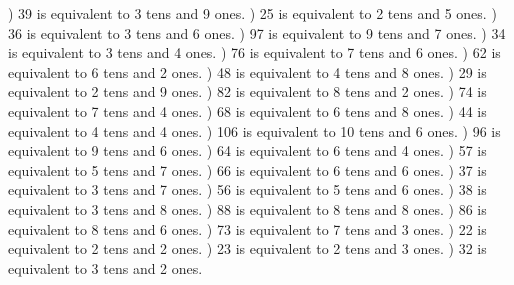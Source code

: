 \documentclass{article}%
\begin{document}
) 39 is equivalent to  3 tens and 9 ones.%
) 25 is equivalent to  2 tens and 5 ones.%
) 36 is equivalent to  3 tens and 6 ones.%
) 97 is equivalent to  9 tens and 7 ones.%
) 34 is equivalent to  3 tens and 4 ones.%
) 76 is equivalent to  7 tens and 6 ones.%
) 62 is equivalent to  6 tens and 2 ones.%
) 48 is equivalent to  4 tens and 8 ones.%
) 29 is equivalent to  2 tens and 9 ones.%
) 82 is equivalent to  8 tens and 2 ones.%
) 74 is equivalent to  7 tens and 4 ones.%
) 68 is equivalent to  6 tens and 8 ones.%
) 44 is equivalent to  4 tens and 4 ones.%
) 106 is equivalent to  10 tens and 6 ones.%
) 96 is equivalent to  9 tens and 6 ones.%
) 64 is equivalent to  6 tens and 4 ones.%
) 57 is equivalent to  5 tens and 7 ones.%
) 66 is equivalent to  6 tens and 6 ones.%
) 37 is equivalent to  3 tens and 7 ones.%
) 56 is equivalent to  5 tens and 6 ones.%
) 38 is equivalent to  3 tens and 8 ones.%
) 88 is equivalent to  8 tens and 8 ones.%
) 86 is equivalent to  8 tens and 6 ones.%
) 73 is equivalent to  7 tens and 3 ones.%
) 22 is equivalent to  2 tens and 2 ones.%
) 23 is equivalent to  2 tens and 3 ones.%
) 32 is equivalent to  3 tens and 2 ones.%
\newline%
\end{document}
